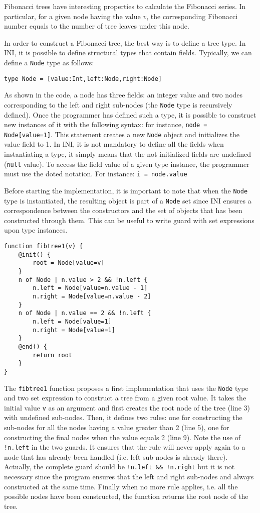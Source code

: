 \documentclass[11pt]{report}
\begin{document}
Fibonacci trees have interesting properties to calculate the Fibonacci series. In particular, for a given node having the value $v$, the corresponding Fibonacci number equals to the number of tree leaves under this node.

In order to construct a Fibonacci tree, the best way is to define a tree type. In INI, it is possible to define structural types that contain fields. Typically, we can define a \texttt{Node} type as follows:

\begin{lstlisting}[numbers=none]
type Node = [value:Int,left:Node,right:Node]
\end{lstlisting}

As shown in the code, a node has three fields: an integer value and two nodes corresponding to the left and right sub-nodes (the \texttt{Node} type is recursively defined). Once the programmer has defined such a type, it is possible to construct new instances of it with the following syntax: for instance, \texttt{node = Node[value=1]}. This statement creates a new \texttt{Node} object and initializes the value field to 1. In INI, it is not mandatory to define all the fields when instantiating a type, it simply means that the not initialized fields are undefined (\texttt{null} value). To access the field value of a given type instance, the programmer must use the doted notation. For instance: \texttt{i = node.value}

Before starting the implementation, it is important to note that when the \texttt{Node} type is instantiated, the resulting object is part of a \texttt{Node} set since INI ensures a correspondence between the constructors and the set of objects that has been constructed through them. This can be useful to write guard with set expressions upon type instances.

\begin{lstlisting}
function fibtree1(v) {
	@init() {
		root = Node[value=v]
	}
	n of Node | n.value > 2 && !n.left {
		n.left = Node[value=n.value - 1]
		n.right = Node[value=n.value - 2]
	}
	n of Node | n.value == 2 && !n.left {
		n.left = Node[value=1]
		n.right = Node[value=1]
	}
	@end() {
		return root
	}
}
\end{lstlisting}

The \texttt{fibtree1} function proposes a first implementation that uses the \texttt{Node} type and two set expression to construct a tree from a given root value. It takes the initial value \texttt{v} as an argument and first creates the root node of the tree (line 3) with undefined sub-nodes. Then, it defines two rules: one for constructing the sub-nodes for all the nodes having a value greater than 2 (line 5), one for constructing the final nodes when the value equals 2 (line 9). Note the use of \texttt{!n.left} in the two guards. It ensures that the rule will never apply again to a node that has already been handled (i.e. left sub-nodes is already there). Actually, the complete guard should be \texttt{!n.left \&\& !n.right} but it is not necessary since the program ensures that the left and right sub-nodes and always constructed at the same time. Finally when no more rule applies, i.e. all the possible nodes have been constructed, the function returns the root node of the tree.
\end{document}
